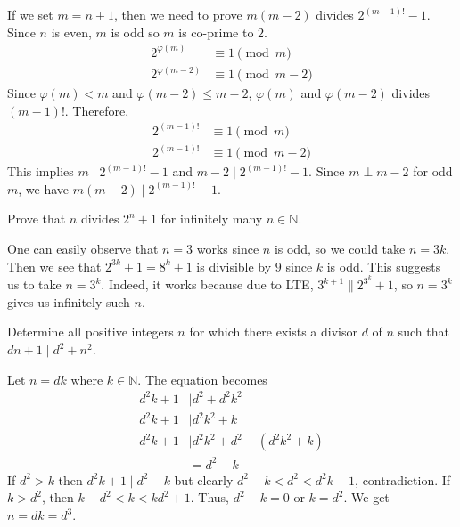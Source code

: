 \documentclass[problems.tex]{subfile}
\begin{document}
	\begin{solution}
		If we set $m=n+1$, then we need to prove $m(m-2)$ divides $2^{(m-1)!}-1$. Since $n$ is even, $m$ is odd so $m$ is co-prime to $2$.
			\begin{align*}
				2^{\varphi(m)} &\equiv1\pmod m\\
				2^{\varphi(m-2)} &\equiv1\pmod{m-2}
			\end{align*}
		Since $\varphi(m)<m$ and $\varphi(m-2)\leq m-2$, $\varphi(m)$ and $\varphi(m-2)$ divides $(m-1)!$. Therefore,
			\begin{align*}
				2^{(m-1)!} & \equiv1\pmod m\\
				2^{(m-1)!} & \equiv1\pmod{m-2}
			\end{align*}
		This implies $m\mid 2^{(m-1)!}-1$ and $m-2\mid 2^{(m-1)!}-1$. Since $m\perp m-2$ for odd $m$, we have $m(m-2)\mid 2^{(m-1)!}-1$.
	\end{solution}

	\begin{problem}
		Prove that $n$ divides $2^n+1$ for infinitely many $n\in\mathbb{N}$.
	\end{problem}

	\begin{solution}
		One can easily observe that $n=3$ works since $n$ is odd, so we could take $n=3k$. Then we see that $2^{3k}+1=8^k+1$ is divisible by $9$ since $k$ is odd. This suggests us to take $n=3^k$. Indeed, it works because due to LTE, $3^{k+1}\|2^{3^k}+1$, so $n=3^k$ gives us infinitely such $n$.
	\end{solution}

	\begin{problem}[Croatia $2015$]
		Determine all positive integers $n$ for which there exists a divisor $d$ of $n$ such that $dn+1\mid d^2+n^2$.
	\end{problem}

	\begin{solution}
		Let $n=dk$ where $k\in\mathbb{N}$. The equation becomes
			\begin{align*}
				d^2k+1 & \mid d^2+d^2k^2\\
				d^2k+1 & \mid d^2k^2+k\\
				d^2k+1 & \mid d^2k^2+d^2-(d^2k^2+k)\\
					   & = d^2-k
			\end{align*}
		If $d^2>k$ then $d^2k+1\mid d^2-k$ but clearly $d^2-k<d^2<d^2k+1$, contradiction. If $k>d^2$, then $k-d^2<k<kd^2+1$. Thus, $d^2-k=0$ or $k=d^2$. We get $n=dk=d^3$.
	\end{solution}
\end{document}
